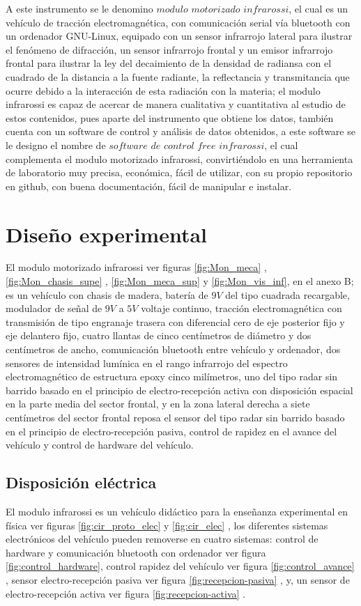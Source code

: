 \documentclass[12]{article}
\begin{document}
\begin{multicols}{2}
A este instrumento se le denomino $modulo$ $motorizado$ $infrarossi$, el cual es un vehículo de tracción electromagnética, con comunicación serial vía bluetooth con un ordenador GNU-Linux, equipado con un sensor infrarrojo lateral para ilustrar el fenómeno de difracción, un sensor infrarrojo frontal y un emisor infrarrojo frontal para ilustrar la ley del decaimiento de  la densidad de radiansa con el cuadrado de la distancia a la fuente radiante,  la reflectancia y  transmitancia que ocurre debido a la interacción de esta radiación con la materia; el modulo infrarossi es capaz de acercar de manera cualitativa y cuantitativa al estudio de estos contenidos, pues aparte del instrumento que obtiene los datos, también cuenta con un software de control   y análisis de datos obtenidos, a este software se le designo el nombre de $software$ $de$ $control$ $free$ $infrarossi$, el cual complementa el modulo motorizado infrarossi, convirtiéndolo en una herramienta de laboratorio muy precisa, económica, fácil de utilizar, con su propio repositorio en github, con buena  documentación, fácil de manipular e instalar.
\section{Diseño experimental}
El modulo motorizado infrarossi ver figuras \ref{fig:Mon_meca} , \ref{fig:Mon_chasis_supe} , \ref{fig:Mon_meca_sup} y \ref{fig:Mon_vis_inf}, en el anexo B; es un vehículo con chasis de madera,  batería de $9 V$ del tipo cuadrada recargable,  modulador de señal de $9 V$ a  $5 V$ voltaje continuo, tracción electromagnética con  transmisión de tipo engranaje trasera con diferencial cero de eje posterior fijo y eje delantero fijo, cuatro llantas de cinco centímetros de diámetro y dos centímetros de ancho, comunicación bluetooth entre vehículo y ordenador, dos  sensores de intensidad lumínica en el rango infrarrojo del espectro electromagnético de estructura epoxy cinco milímetros, uno del tipo radar sin barrido basado en el principio de electro-recepción\cite{ELECTRORRECPCION} activa con disposición espacial en la parte media del sector frontal,  y en la zona lateral derecha a siete centímetros del sector frontal reposa el sensor del tipo radar sin barrido basado en el principio de electro-recepción pasiva, control de rapidez en el avance del vehículo y control de hardware del vehículo. 
\subsection{Disposición eléctrica}
El modulo infrarossi es un vehículo didáctico para la enseñanza experimental en física ver figuras \ref{fig:cir_proto_elec} y \ref{fig:cir_elec} , los diferentes sistemas electrónicos del vehículo pueden removerse en cuatro sistemas: control de hardware y comunicación bluetooth con ordenador ver figura \ref{fig:control_hardware}, control rapidez del vehículo ver figura \ref{fig:control_avance}  , sensor electro-recepción pasiva ver figura \ref{fig:recepcion-pasiva} , y, un sensor de electro-recepción activa ver figura \ref{fig:recepcion-activa} . 

\end{multicols}
\end{document}
